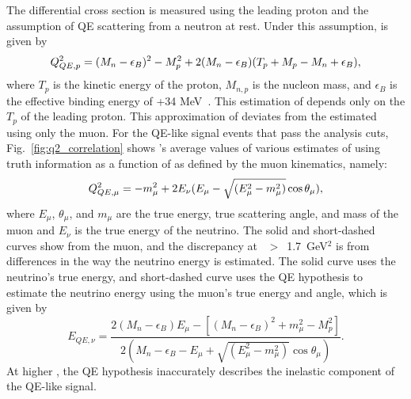 The differential cross section \dsdq is measured using the leading proton 
and the assumption of QE scattering from a neutron at rest. 
Under this assumption, \QSq is given by 
\begin{equation*}
Q^{2}_{QE,p}=(M_{n}-\epsilon_B)^2-M^2_{p}+2(M_{n}-\epsilon_{B})(T_{p}+M_{p}-M_{n}+\epsilon_{B}),
\end{equation*}
where $T_{p}$ is the kinetic energy of the proton, $M_{n,p}$ is the nucleon mass, 
and $\epsilon_B$ is the effective binding energy of +34 MeV~\cite{Moniz:1971mt}. 
This estimation of \QSqproton depends only on the $T_{p}$ of the leading proton.
This approximation of 
\QSqproton deviates from the \QSq estimated using only the muon. 
For the QE-like signal events that pass the analysis cuts, Fig.~\ref{fig:q2_correlation} 
shows \genie's  average values of various estimates of \QSq using truth information
as a function of \QSq as defined by the muon kinematics, namely: 
\begin{equation*}
Q^{2}_{QE,\mu}=-m^{2}_{\mu}+2E_{\nu}(E_{\mu}-\sqrt{(E^{2}_{\mu}-m^{2}_{\mu})}\cos\theta_{\mu}),
\end{equation*}
where $E_{\mu}$, $\theta_{\mu}$, and $m_{\mu}$ are the true energy, 
true scattering angle, and mass of the muon and $E_{\nu}$ is the true 
energy of the neutrino. The solid and short-dashed curves show \QSqmuon 
from the muon, and the discrepancy at \QSqmuon~$>$~1.7~GeV$^{2}$ is from
differences in the way the neutrino energy is estimated. The solid curve uses the 
neutrino's true energy, and short-dashed curve uses the QE hypothesis 
to estimate the neutrino energy using the muon's true energy and angle, which is given by 
\begin{equation*}
E_{QE,\nu}=\frac{2(M_{n}-\epsilon_{B})E_{\mu}-[(M_{n}-\epsilon_{B})^{2}+m^{2}_{\mu}-M^{2}_{p}]}{2(M_{n}-\epsilon_{B}-E_{\mu}+\sqrt{(E^{2}_{\mu}-m^{2}_{\mu})}\cos\theta_{\mu})}.
\end{equation*}
At higher \QSqmuon, the QE hypothesis inaccurately describes the inelastic 
component of the QE-like signal. 

